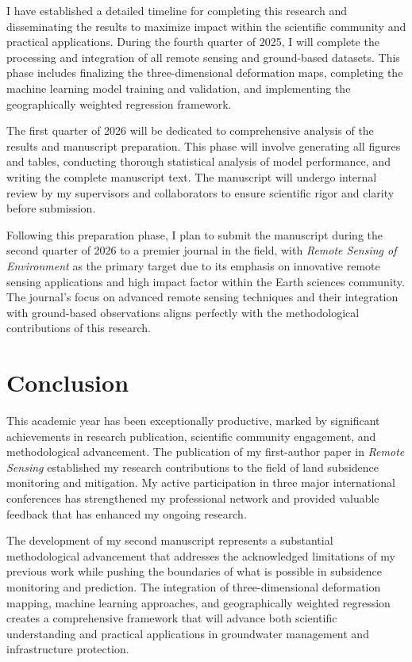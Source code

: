 \documentclass[12pt, a4paper]{article}
\begin{document}
	I have established a detailed timeline for completing this research and disseminating the results to maximize impact within the scientific community and practical applications. During the fourth quarter of 2025, I will complete the processing and integration of all remote sensing and ground-based datasets. This phase includes finalizing the three-dimensional deformation maps, completing the machine learning model training and validation, and implementing the geographically weighted regression framework.
	
	The first quarter of 2026 will be dedicated to comprehensive analysis of the results and manuscript preparation. This phase will involve generating all figures and tables, conducting thorough statistical analysis of model performance, and writing the complete manuscript text. The manuscript will undergo internal review by my supervisors and collaborators to ensure scientific rigor and clarity before submission.
	
	Following this preparation phase, I plan to submit the manuscript during the second quarter of 2026 to a premier journal in the field, with \textit{Remote Sensing of Environment} as the primary target due to its emphasis on innovative remote sensing applications and high impact factor within the Earth sciences community. The journal's focus on advanced remote sensing techniques and their integration with ground-based observations aligns perfectly with the methodological contributions of this research.
	
	\section{Conclusion}
	
	This academic year has been exceptionally productive, marked by significant achievements in research publication, scientific community engagement, and methodological advancement. The publication of my first-author paper in \textit{Remote Sensing} established my research contributions to the field of land subsidence monitoring and mitigation. My active participation in three major international conferences has strengthened my professional network and provided valuable feedback that has enhanced my ongoing research.
	
	The development of my second manuscript represents a substantial methodological advancement that addresses the acknowledged limitations of my previous work while pushing the boundaries of what is possible in subsidence monitoring and prediction. The integration of three-dimensional deformation mapping, machine learning approaches, and geographically weighted regression creates a comprehensive framework that will advance both scientific understanding and practical applications in groundwater management and infrastructure protection.
	
\end{document}
